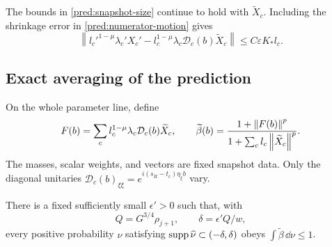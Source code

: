 The bounds in \eqref{pred:snapshot-size} continue to hold with
\(\widetilde X_c\). Including the shrinkage error in
\eqref{pred:numerator-motion} gives
\begin{equation}
 \left\|l_c'^{1-\mu}\lambda_c'X_c'
       -l_c^{1-\mu}\lambda_c\mathcal D_c(b)\widetilde X_c\right\|
       \le C\varepsilon K_* l_c.
 \label{pred:shrunk-numerator-motion}
\end{equation}

\subsection{Exact averaging of the prediction}

On the whole parameter line, define
\begin{equation}
 F(b)=\sum_c l_c^{1-\mu}\lambda_c
                   \mathcal D_c(b)\widetilde X_c,\qquad
 \widetilde\beta(b)=
       \frac{1+\left\|F(b)\right\|^p}
            {1+\sum_c l_c\left\|\widetilde X_c\right\|^p}.
 \label{pred:model}
\end{equation}
The masses, scalar weights, and vectors are fixed snapshot data.
Only the diagonal unitaries
\(\mathcal D_c(b)_{\xi\xi}=e^{i(s_R-t_c)\eta_\xi b}\) vary.

\begin{lemma}
\label{pred:fourier-average}
There is a fixed sufficiently small \(\epsilon'>0\) such that, with
\begin{equation}
 Q=G^{3/4}\rho_{j+1},\qquad \delta=\epsilon' Q/w,
 \label{pred:separation-bandwidth}
\end{equation}
every positive probability \(\nu\) satisfying
\(\operatorname{supp}\widehat\nu\subset(-\delta,\delta)\) obeys
\(\int\widetilde\beta\,\dd\nu\le1\).
\end{lemma}

